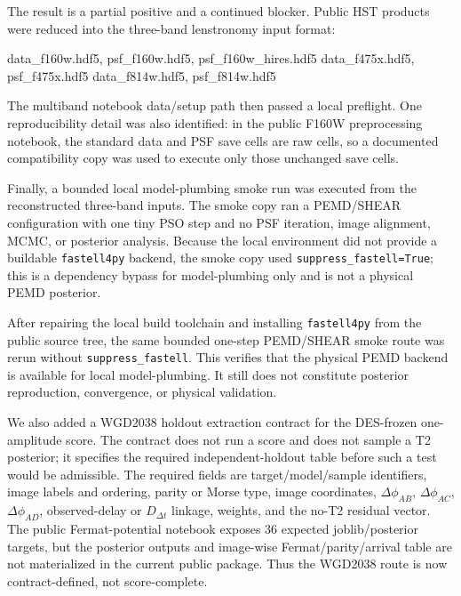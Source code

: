 \documentclass[11pt]{article}
\newenvironment{Shaded}{}{}
\newcommand{\NormalTok}[1]{#1}
\begin{document}
The result is a partial positive and a continued blocker. Public HST
products were reduced into the three-band lenstronomy input format:

\begin{Shaded}
\begin{Highlighting}[]
\NormalTok{data\_f160w.hdf5, psf\_f160w.hdf5, psf\_f160w\_hires.hdf5}
\NormalTok{data\_f475x.hdf5, psf\_f475x.hdf5}
\NormalTok{data\_f814w.hdf5, psf\_f814w.hdf5}
\end{Highlighting}
\end{Shaded}

The multiband notebook data/setup path then passed a local preflight.
One reproducibility detail was also identified: in the public F160W
preprocessing notebook, the standard data and PSF save cells are raw
cells, so a documented compatibility copy was used to execute only those
unchanged save cells.

Finally, a bounded local model-plumbing smoke run was executed from the
reconstructed three-band inputs. The smoke copy ran a PEMD/SHEAR
configuration with one tiny PSO step and no PSF iteration, image
alignment, MCMC, or posterior analysis. Because the local environment did
not provide a buildable \texttt{fastell4py} backend, the smoke copy used
\texttt{suppress\_fastell=True}; this is a dependency bypass for model-plumbing
only and is not a physical PEMD posterior.

After repairing the local build toolchain and installing \texttt{fastell4py}
from the public source tree, the same bounded one-step PEMD/SHEAR smoke
route was rerun without \texttt{suppress\_fastell}. This verifies that the
physical PEMD backend is available for local model-plumbing. It still does
not constitute posterior reproduction, convergence, or physical validation.

We also added a WGD2038 holdout extraction contract for the DES-frozen
one-amplitude score. The contract does not run a score and does not sample a
T2 posterior; it specifies the required independent-holdout table before such a
test would be admissible. The required fields are target/model/sample
identifiers, image labels and ordering, parity or Morse type, image
coordinates, \(\Delta\phi_{AB}\), \(\Delta\phi_{AC}\), \(\Delta\phi_{AD}\),
observed-delay or \(D_{\Delta t}\) linkage, weights, and the no-T2 residual
vector. The public Fermat-potential notebook exposes 36 expected
joblib/posterior targets, but the posterior outputs and image-wise
Fermat/parity/arrival table are not materialized in the current public package.
Thus the WGD2038 route is now contract-defined, not score-complete.
\end{document}
